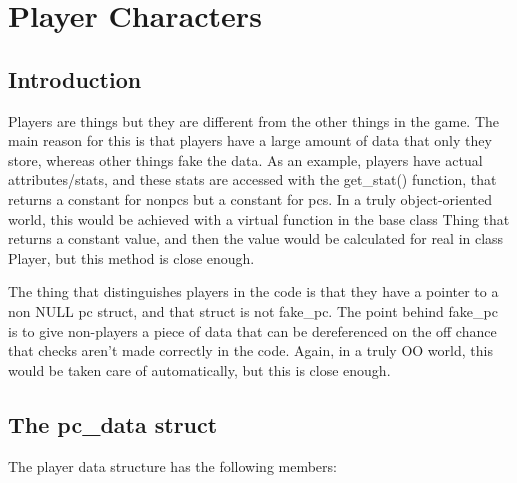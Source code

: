 \chapter{Player Characters}


\section{Introduction}

Players are things but they are different from the other things in the
game. The main reason for this is that players have a large amount of
data that only they store, whereas other things fake the data. As an
example, players have actual attributes/stats, and these stats are
accessed with the get\_stat() function, that returns a constant for
nonpcs but a constant for pcs. In a truly object-oriented world, this
would be achieved with a virtual function in the base class Thing that
returns a constant value, and then the value would be calculated for
real in class Player, but this method is close enough.

The thing that distinguishes players in the code is that they have a
pointer to a non NULL pc struct, and that struct is not fake\_pc. The
point behind fake\_pc is to give non-players a piece of data that can
be dereferenced on the off chance that checks aren't made correctly in
the code. Again, in a truly OO world, this would be taken care of
automatically, but this is close enough.

\section{The pc\_data struct}


The player data structure has the following members:

